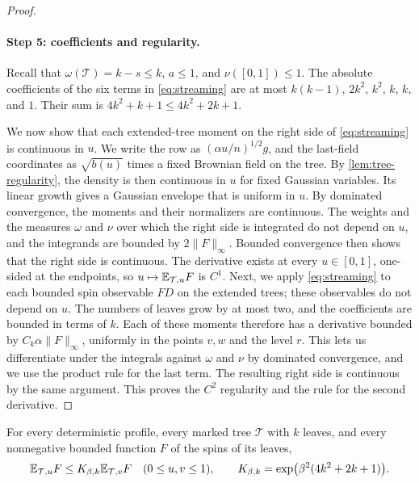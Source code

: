 \begin{proof}
\paragraph{Step 5: coefficients and regularity.}
Recall that $\omega(\mathcal T)=k-s\le k$, $a\le1$, and $\nu([0,1])\le1$. The
absolute coefficients of the six terms in \eqref{eq:streaming} are
at most $k(k-1)$, $2k^2$, $k^2$, $k$, $k$, and $1$. Their sum is
$4k^2+k+1\le4k^2+2k+1$.

We now show that each extended-tree moment on the right side of
\eqref{eq:streaming} is continuous in $u$. We write the row as
$(\alpha u/n)^{1/2}g$, and the last-field coordinates as $\sqrt{b(u)}$
times a fixed Brownian field on the tree. By \cref{lem:tree-regularity},
the density is then continuous in $u$ for fixed Gaussian variables. Its
linear growth gives a Gaussian envelope that is uniform in $u$. By
dominated convergence, the moments and their normalizers are continuous.
The weights and the measures $\omega$ and $\nu$ over which the right side
is integrated do not depend on $u$, and the integrands are bounded by
$2\|F\|_\infty$. Bounded convergence then shows that the right side is
continuous. The derivative exists at every $u\in[0,1]$, one-sided at the
endpoints, so $u\mapsto\mathbb E_{\mathcal T,u}F$ is $C^1$.
Next, we apply \eqref{eq:streaming} to each bounded spin observable $FD$
on the extended trees; these observables do not depend on $u$. The
numbers of leaves grow by at most two, and the coefficients are bounded
in terms of $k$. Each of these moments therefore has a derivative bounded
by $C_k\alpha\|F\|_\infty$, uniformly in the points $v,w$ and the level
$r$. This lets us differentiate under the integrals against $\omega$ and
$\nu$ by dominated convergence, and we use the product rule for the last
term. The resulting right side is continuous by the same argument. This
proves the $C^2$ regularity and the rule for the second derivative.
\end{proof}

\begin{corollary}\label{cor:comparison}
For every deterministic profile, every marked tree $\mathcal T$ with $k$
leaves, and every nonnegative bounded function $F$ of the spins of its
leaves,
\begin{equation}\label{eq:comparison}
 \mathbb E_{\mathcal T,u}F\le K_{\beta,k}\mathbb E_{\mathcal T,v}F
 \quad(0\le u,v\le1),
 \qquad K_{\beta,k}=\exp\bigl(\beta^2(4k^2+2k+1)\bigr).
\end{equation}
\end{corollary}

